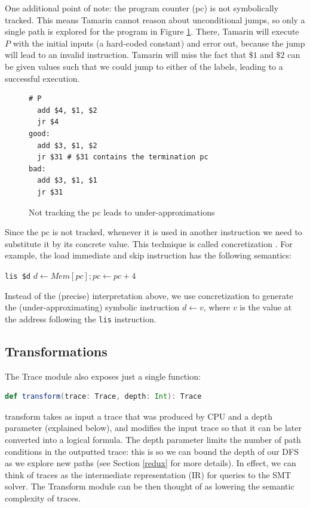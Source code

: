 \documentclass{llncs}
\begin{document}
One additional point of note: the program counter (\textsf{pc}) is not symbolically tracked. This means Tamarin cannot reason about unconditional jumps, so only a single path is explored for the program in Figure \ref{pcnottrack}. There, Tamarin will execute $P$ with the initial inputs (a hard-coded constant) and error out, because the jump will lead to an invalid instruction. Tamarin will miss the fact that $\$1$ and $\$2$ can be given values such that we could jump to either of the labels, leading to a successful  execution. 

\begin{figure}
\begin{lstlisting}
# P
  add $4, $1, $2
  jr $4
good:
  add $3, $1, $2
  jr $31 # $31 contains the termination pc
bad:
  add $3, $1, $1
  jr $31    
\end{lstlisting} 
\caption{Not tracking the \textsf{pc} leads to under-approximations}
\label{pcnottrack}
\end{figure}

Since the \textsf{pc} is not tracked, whenever it is used in another instruction we need to substitute it by its concrete value. This technique is called concretization \cite{david2016specification}. For example, the load immediate and skip instruction has the following semantics:

\lstinline{lis $d} \hspace{2cm} $d \gets Mem[pc]; pc \gets pc + 4$

Instead of the (precise) interpretation above, we use concretization to generate the (under-approximating) symbolic instruction $d \gets v$, where $v$ is the value at the address following the \lstinline{lis} instruction.


\subsection{Transformations}

The \textsf{Trace} module also exposes just a single function:

\begin{lstlisting}[language=scala]
def transform(trace: Trace, depth: Int): Trace
\end{lstlisting}

\textsf{transform} takes as input a trace that was produced by \textsf{CPU} and a \textsf{depth} parameter (explained below), and modifies the input trace so that it can be later converted into a logical formula. The \textsf{depth} parameter limits the number of path conditions in the outputted trace: this is so we can bound the depth of our DFS as we explore new paths (see Section \ref{redux} for more details). In effect, we can think of traces as the intermediate representation (IR) for queries to the SMT solver. The \textsf{Transform} module can be then thought of as lowering the semantic complexity of traces.
\end{document}
